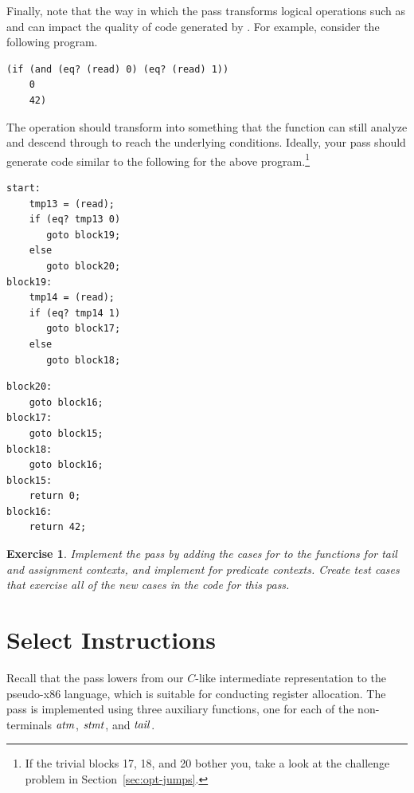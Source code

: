\documentclass[11pt]{book}
\newtheorem{exercise}[theorem]{Exercise}
\begin{document}
Finally, note that the way in which the  pass transforms
logical operations such as  and  can impact the
quality of code generated by . For example,
consider the following program.
\begin{lstlisting}
(if (and (eq? (read) 0) (eq? (read) 1))
    0
    42)  
\end{lstlisting}
The  operation should transform into something that the
 function can still analyze and descend through to
reach the underlying  conditions. Ideally, your
 pass should generate code similar to the
following for the above program.\footnote{If the trivial blocks 17,
  18, and 20 bother you, take a look at the challenge problem in
  Section~\ref{sec:opt-jumps}.}
\begin{center}
\begin{minipage}{0.45\textwidth}
\begin{lstlisting}
start:
    tmp13 = (read);
    if (eq? tmp13 0)
       goto block19;
    else
       goto block20;
block19:
    tmp14 = (read);
    if (eq? tmp14 1)
       goto block17;
    else
       goto block18;
\end{lstlisting}
\end{minipage}
\begin{minipage}{0.45\textwidth}
\begin{lstlisting}
block20:
    goto block16;
block17:
    goto block15;
block18:
    goto block16;
block15:
    return 0;
block16:
    return 42;
\end{lstlisting}
\end{minipage}
\end{center}

\begin{exercise}\normalfont
  Implement the pass  by adding the cases for
   to the functions for tail and assignment contexts, and
  implement  for predicate contexts. Create test
  cases that exercise all of the new cases in the code for this pass.
\end{exercise}


\section{Select Instructions}
\label{sec:select-r2}

Recall that the  pass lowers from our
$C$-like intermediate representation to the pseudo-x86 language, which
is suitable for conducting register allocation. The pass is
implemented using three auxiliary functions, one for each of the
non-terminals $\mathit{atm}$, $\mathit{stmt}$, and $\mathit{tail}$.
\end{document}
